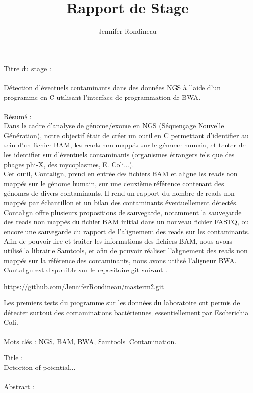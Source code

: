 \documentclass[a4paper,12pt]{article}
\title{Rapport de Stage}
\author{Jennifer Rondineau}
\begin{document}
 

Titre du stage : \\\\
Détection d'éventuels contaminants dans des données NGS à l'aide d'un programme en C utilisant l'interface de programmation de BWA. \\
\\
Résumé : \\

Dans le cadre d'analyse de génome/exome en NGS (Séquençage Nouvelle Génération), notre objectif était de créer un outil en C permettant d'identifier au sein d'un fichier BAM, les reads non mappés sur le génome humain, et tenter de les identifier sur d'éventuels contaminants (organismes étrangers tels que des phages phi-X, des mycoplasmes, E. Coli...). \\
Cet outil, Contalign, prend en entrée des fichiers BAM et aligne les reads non mappés sur le génome humain, sur une deuxième référence contenant des génomes de divers contaminants. Il rend un rapport du nombre de reads non mappés par échantillon et un bilan des contaminants éventuellement détectés. \\
Contalign offre plusieurs propositions de sauvegarde, notamment la sauvegarde des reads non mappés du fichier BAM initial dans un nouveau fichier FASTQ, ou encore une sauvegarde du rapport de l'alignement des reads sur les contaminants.\\
Afin de pouvoir lire et traiter les informations des fichiers BAM, nous avons utilisé la librairie Samtools, et afin de pouvoir réaliser l'alignement des reads non mappés sur la référence des contaminants, nous avons utilisé l'aligneur BWA. Contalign est disponible sur le repositoire git suivant : \begin{center} https://github.com/JenniferRondineau/masterm2.git \end{center}
Les premiers tests du programme sur les données du laboratoire ont permis de détecter surtout des contaminations bactériennes, essentiellement par  Escherichia Coli.\\\\

Mots clés : NGS, BAM, BWA, Samtools, Contamination. \\
\clearpage

Title : \\

Detection of potential... \\
\\
Abstract : \\
\end{document}
